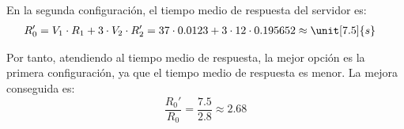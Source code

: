 \begin{ejercicio}
\begin{enumerate}
        En la segunda configuración, el tiempo medio de respuesta del servidor es:
        \begin{align*}
            R_0' &= V_1 \cdot R_1 + 3 \cdot V_2 \cdot R_2' = 37 \cdot 0.0123 + 3 \cdot 12 \cdot 0.195652 \approx \unit[7.5]{s}
        \end{align*}

        Por tanto, atendiendo al tiempo medio de respuesta, la mejor opción es la primera configuración, ya que el tiempo medio de respuesta es menor. La mejora conseguida es:
        \begin{equation*}
            \dfrac{R_0'}{R_0} = \dfrac{7.5}{2.8} \approx 2.68
        \end{equation*}
    \end{enumerate}
\end{ejercicio}
\begin{comment}
\solucion
    \begin{enumerate}
        \item En el primer caso el cuello de botella es el disco. La productividad máxima es $0.926$ peticiones por segundo. El tiempo mínimo de respuesta es $1.45$ s, y su valor medio es $2.8$ s.
        \item En el segundo caso los tres discos actúan como cuellos de botella. La productividad máxima tiene el mismo valor que el caso anterior. El tiempo mínimo de respuesta es $3.61$ s y su valor medio es $7.5$ s.
        \item Atendiendo al tiempo de respuesta es preferible disponer de un único disco tres veces más rápido que tres discos lentos; la mejora conseguida en este índice es $2.7$.
    \end{enumerate}
\end{comment}

